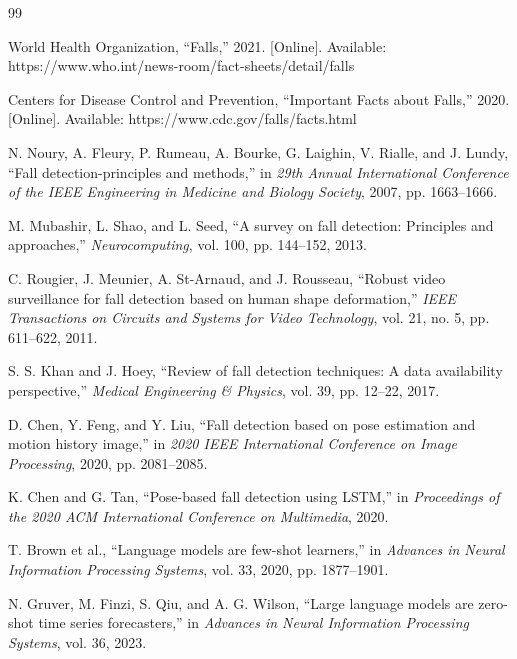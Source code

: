 \documentclass[conference]{IEEEtran}
\begin{document}

\begin{thebibliography}{99}

World Health Organization, ``Falls,'' 2021. [Online]. Available: https://www.who.int/news-room/fact-sheets/detail/falls

Centers for Disease Control and Prevention, ``Important Facts about Falls,'' 2020. [Online]. Available: https://www.cdc.gov/falls/facts.html

N. Noury, A. Fleury, P. Rumeau, A. Bourke, G. Laighin, V. Rialle, and J. Lundy, ``Fall detection-principles and methods,'' in \textit{29th Annual International Conference of the IEEE Engineering in Medicine and Biology Society}, 2007, pp. 1663--1666.

M. Mubashir, L. Shao, and L. Seed, ``A survey on fall detection: Principles and approaches,'' \textit{Neurocomputing}, vol. 100, pp. 144--152, 2013.

C. Rougier, J. Meunier, A. St-Arnaud, and J. Rousseau, ``Robust video surveillance for fall detection based on human shape deformation,'' \textit{IEEE Transactions on Circuits and Systems for Video Technology}, vol. 21, no. 5, pp. 611--622, 2011.

S. S. Khan and J. Hoey, ``Review of fall detection techniques: A data availability perspective,'' \textit{Medical Engineering \& Physics}, vol. 39, pp. 12--22, 2017.

D. Chen, Y. Feng, and Y. Liu, ``Fall detection based on pose estimation and motion history image,'' in \textit{2020 IEEE International Conference on Image Processing}, 2020, pp. 2081--2085.

K. Chen and G. Tan, ``Pose-based fall detection using LSTM,'' in \textit{Proceedings of the 2020 ACM International Conference on Multimedia}, 2020.

T. Brown et al., ``Language models are few-shot learners,'' in \textit{Advances in Neural Information Processing Systems}, vol. 33, 2020, pp. 1877--1901.

N. Gruver, M. Finzi, S. Qiu, and A. G. Wilson, ``Large language models are zero-shot time series forecasters,'' in \textit{Advances in Neural Information Processing Systems}, vol. 36, 2023.


\end{thebibliography}
\end{document}
